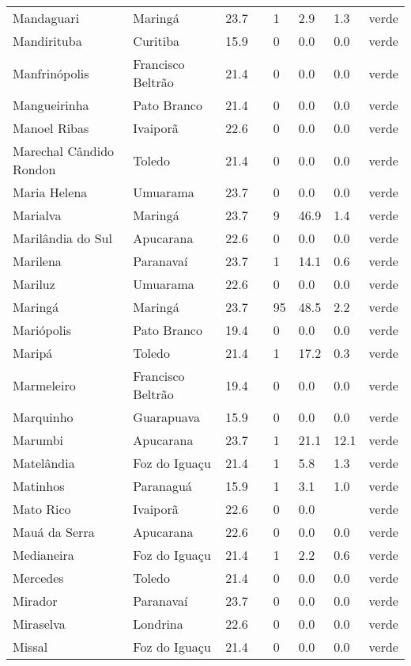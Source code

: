 \begin{longtable}{l|lllllll}
  Mandaguari & Maringá & 23.7 &  & 1 & 2.9 & 1.3 & verde \\ 
  Mandirituba & Curitiba & 15.9 &  & 0 & 0.0 & 0.0 & verde \\ 
  Manfrinópolis & Francisco Beltrão & 21.4 &  & 0 & 0.0 & 0.0 & verde \\ 
  Mangueirinha & Pato Branco & 21.4 &  & 0 & 0.0 & 0.0 & verde \\ 
  Manoel Ribas & Ivaiporã & 22.6 &  & 0 & 0.0 & 0.0 & verde \\ 
  Marechal Cândido Rondon & Toledo & 21.4 &  & 0 & 0.0 & 0.0 & verde \\ 
  Maria Helena & Umuarama & 23.7 &  & 0 & 0.0 & 0.0 & verde \\ 
  Marialva & Maringá & 23.7 &  & 9 & 46.9 & 1.4 & verde \\ 
  Marilândia do Sul & Apucarana & 22.6 &  & 0 & 0.0 & 0.0 & verde \\ 
  Marilena & Paranavaí & 23.7 &  & 1 & 14.1 & 0.6 & verde \\ 
  Mariluz & Umuarama & 22.6 &  & 0 & 0.0 & 0.0 & verde \\ 
  Maringá & Maringá & 23.7 &  & 95 & 48.5 & 2.2 & verde \\ 
  Mariópolis & Pato Branco & 19.4 &  & 0 & 0.0 & 0.0 & verde \\ 
  Maripá & Toledo & 21.4 &  & 1 & 17.2 & 0.3 & verde \\ 
  Marmeleiro & Francisco Beltrão & 19.4 &  & 0 & 0.0 & 0.0 & verde \\ 
  Marquinho & Guarapuava & 15.9 &  & 0 & 0.0 & 0.0 & verde \\ 
  Marumbi & Apucarana & 23.7 &  & 1 & 21.1 & 12.1 & verde \\ 
  Matelândia & Foz do Iguaçu & 21.4 &  & 1 & 5.8 & 1.3 & verde \\ 
  Matinhos & Paranaguá & 15.9 &  & 1 & 3.1 & 1.0 & verde \\ 
  Mato Rico & Ivaiporã & 22.6 &  & 0 & 0.0 &  & verde \\ 
  Mauá da Serra & Apucarana & 22.6 &  & 0 & 0.0 & 0.0 & verde \\ 
  Medianeira & Foz do Iguaçu & 21.4 &  & 1 & 2.2 & 0.6 & verde \\ 
  Mercedes & Toledo & 21.4 &  & 0 & 0.0 & 0.0 & verde \\ 
  Mirador & Paranavaí & 23.7 &  & 0 & 0.0 & 0.0 & verde \\ 
  Miraselva & Londrina & 22.6 &  & 0 & 0.0 & 0.0 & verde \\ 
  Missal & Foz do Iguaçu & 21.4 &  & 0 & 0.0 & 0.0 & verde \\ 

\end{longtable}
